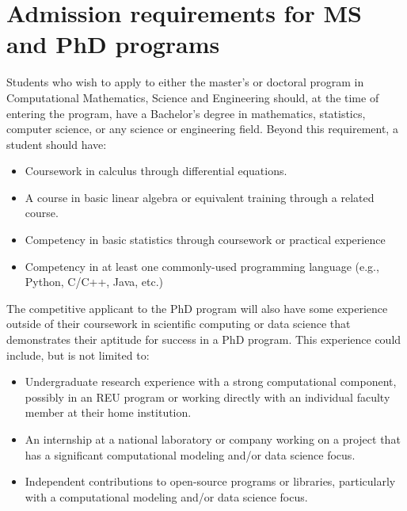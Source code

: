 \section{Admission requirements for MS and PhD programs}
\label{sec:grad_admission}

Students who wish to apply to either the master's or doctoral program in Computational
Mathematics, Science and Engineering should, at the time of entering
the program, have a Bachelor's degree in mathematics, statistics,
computer science, or any science or engineering field.  Beyond this
requirement, a student should have:

\begin{itemize}
\item Coursework in calculus through differential equations.

\item A course in basic linear algebra or equivalent training through
  a related course.

\item Competency in basic statistics through coursework or practical
  experience

\item Competency in at least one commonly-used programming language
  (e.g., Python, C/C++, Java, etc.)

\end{itemize}

The competitive applicant to the PhD program will also have some experience outside of
their coursework in scientific computing or data science that
demonstrates their aptitude for success in a PhD program.  This
experience could include, but is not limited to:  

\begin{itemize}
\item Undergraduate research experience with a strong computational
  component, possibly in an REU program or working directly with an
  individual faculty member at their home institution.

\item An internship at a national laboratory or company working on a
  project that has a significant computational modeling and/or data
  science focus.

\item Independent contributions to open-source programs or libraries,
  particularly with a computational modeling and/or data science
  focus.
\end{itemize}

